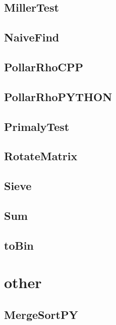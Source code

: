 \subsection{ MillerTest}
\raggedbottom
\hrulefill
\subsection{ NaiveFind}
\raggedbottom
\hrulefill
\subsection{ PollarRhoCPP}
\raggedbottom
\hrulefill
\subsection{ PollarRhoPYTHON}
\raggedbottom
\hrulefill
\subsection{ PrimalyTest}
\raggedbottom
\hrulefill
\subsection{ RotateMatrix}
\raggedbottom
\hrulefill
\subsection{ Sieve}
\raggedbottom
\hrulefill
\subsection{ Sum}
\raggedbottom
\hrulefill
\subsection{ toBin}
\raggedbottom
\hrulefill

\section{other}
\subsection{ MergeSortPY}
\raggedbottom
\hrulefill
